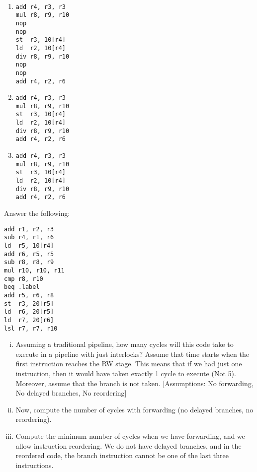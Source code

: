 \begin{ExerciseList}
\Answer
\hspace{1mm} \\
\begin{enumerate}
\item 
\begin{verbatim}
add r4, r3, r3
mul r8, r9, r10
nop
nop
st  r3, 10[r4]
ld  r2, 10[r4]
div r8, r9, r10
nop
nop
add r4, r2, r6
\end{verbatim}
\item 
\begin{verbatim}
add r4, r3, r3
mul r8, r9, r10
st  r3, 10[r4]
ld  r2, 10[r4]
div r8, r9, r10
add r4, r2, r6
\end{verbatim}
\item 
\begin{verbatim}
add r4, r3, r3
mul r8, r9, r10
st  r3, 10[r4]
ld  r2, 10[r4]
div r8, r9, r10
add r4, r2, r6
\end{verbatim}
\end{enumerate}

\Exercise
Answer the following:

\begin{verbatim}
add r1, r2, r3
sub r4, r1, r6
ld  r5, 10[r4]
add r6, r5, r5
sub r8, r8, r9
mul r10, r10, r11
cmp r8, r10
beq .label
add r5, r6, r8
st  r3, 20[r5]
ld  r6, 20[r5]
ld  r7, 20[r6]
lsl r7, r7, r10
\end{verbatim} 

\begin{enumerate}[i) ]

\item Assuming a traditional \simplerisc pipeline, how many cycles will this code take to execute in a pipeline
with just interlocks? 
Assume that time starts when the first instruction reaches the RW stage. 
This means that if we had just one instruction, then it would have taken  exactly 1 cycle to execute (Not 5).
Moreover, assume that the branch is not taken.
[Assumptions: No forwarding, No delayed branches, No reordering] 

\item Now, compute the number of cycles with forwarding (no delayed branches, no reordering). 

\item Compute the minimum number of cycles when we have forwarding, and we allow instruction reordering.
We do not have delayed branches, and in the reordered code, the branch instruction cannot be one of the last three
instructions.


\end{enumerate}
\end{ExerciseList}
